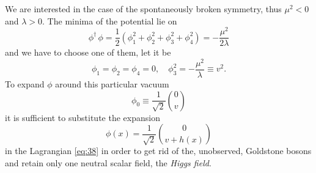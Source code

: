 We are interested in the case of the spontaneously broken symmetry,
thus $\mu^{2} < 0$ and $\lambda > 0$. The minima of the potential lie
on
\begin{equation}
  \label{eq:40}
  \phi^{\dagger}\,\phi = \frac{1}{2} (\phi_{1}^{2} + \phi_{2}^{2} +
  \phi_{3}^{2} + \phi_{4}^{2}) = - \frac{\mu^{2}}{2 \lambda}
\end{equation}
and we have to choose one of them, let it be
\begin{equation}
  \label{eq:41}
  \phi_{1} = \phi_{2} = \phi_{4} = 0, \quad \phi_{3}^{2} = -
  \frac{\mu^{2}}{\lambda} \equiv v^{2}.
\end{equation}
To expand $\phi$ around this particular vacuum
\begin{equation}
  \label{eq:42}
  \phi_{0} \equiv \frac{1}{\sqrt{2}} \binom{0}{v}
\end{equation}
it is sufficient to substitute the expansion
\begin{equation}
  \label{eq:43}
  \phi (x) = \frac{1}{\sqrt{2}} \binom{0}{v + h(x)}
\end{equation}
in the Lagrangian \eqref{eq:38} in order to get rid of the,
unobserved, Goldstone bosons and retain only one neutral scalar field,
the \emph{Higgs field}.

